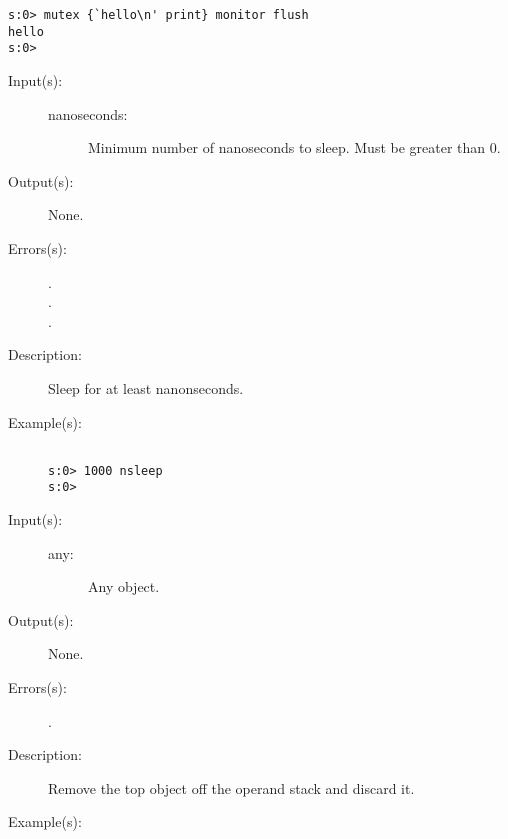 \begin{description}
\begin{description}
\begin{verbatim}
s:0> mutex {`hello\n' print} monitor flush
hello
s:0>
		\end{verbatim}
	\end{description}
\label{systemdict:nsleep}
\item[{\onyxop{nanoseconds}{nsleep}{--}}: ]
	\begin{description}\item[]
	\item[Input(s): ]
		\begin{description}\item[]
		\item[nanoseconds: ]
			Minimum number of nanoseconds to sleep.  Must be greater
			than 0.
		\end{description}
	\item[Output(s): ] None.
	\item[Errors(s): ]
		\begin{description}\item[]
		\item[.]
		\item[.]
		\item[.]
		\end{description}
	\item[Description: ]
		Sleep for at least  nanonseconds.
	\item[Example(s): ]\begin{verbatim}

s:0> 1000 nsleep
s:0>
		\end{verbatim}
	\end{description}
\label{systemdict:pop}
\item[{\onyxop{any}{pop}{--}}: ]
	\begin{description}\item[]
	\item[Input(s): ]
		\begin{description}\item[]
		\item[any: ]
			Any object.
		\end{description}
	\item[Output(s): ] None.
	\item[Errors(s): ]
		\begin{description}\item[]
		\item[.]
		\end{description}
	\item[Description: ]
		Remove the top object off the operand stack and discard it.
	\item[Example(s): ]\begin{verbatim}


\end{verbatim}
\end{description}
\end{description}
